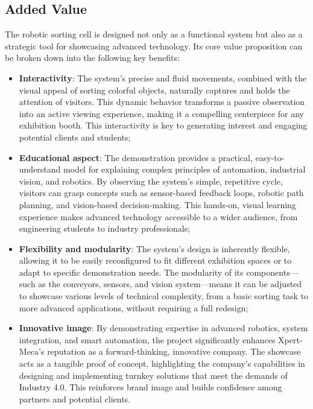 \subsection{Added Value}
The robotic sorting cell is designed not only as a functional system but also as a strategic tool for showcasing advanced technology. Its core value proposition can be broken down into the following key benefits:

\begin{itemize}
\item \textbf{Interactivity}: The system's precise and fluid movements, combined with the visual appeal of sorting colorful objects, naturally captures and holds the attention of visitors. This dynamic behavior transforms a passive observation into an active viewing experience, making it a compelling centerpiece for any exhibition booth. This interactivity is key to generating interest and engaging potential clients and students;

\item \textbf{Educational aspect}: The demonstration provides a practical, easy-to-understand model for explaining complex principles of automation, industrial vision, and robotics. By observing the system's simple, repetitive cycle, visitors can grasp concepts such as sensor-based feedback loops, robotic path planning, and vision-based decision-making. This hands-on, visual learning experience makes advanced technology accessible to a wider audience, from engineering students to industry professionals;

\item \textbf{Flexibility and modularity}: The system's design is inherently flexible, allowing it to be easily reconfigured to fit different exhibition spaces or to adapt to specific demonstration needs. The modularity of its components—such as the conveyors, sensors, and vision system—means it can be adjusted to showcase various levels of technical complexity, from a basic sorting task to more advanced applications, without requiring a full redesign;

\item \textbf{Innovative image}: By demonstrating expertise in advanced robotics, system integration, and smart automation, the project significantly enhances Xpert-Meca's reputation as a forward-thinking, innovative company. The showcase acts as a tangible proof of concept, highlighting the company’s capabilities in designing and implementing turnkey solutions that meet the demands of Industry 4.0. This reinforces brand image and builds confidence among partners and potential clients.
\end{itemize}


